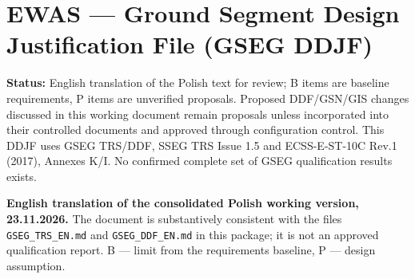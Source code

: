 \section*{EWAS — Ground Segment Design Justification File (GSEG DDJF)}

\textbf{Status:} English translation of the Polish text for review; B items are baseline requirements, P items are unverified proposals. Proposed DDF/\allowbreak{}GSN/\allowbreak{}GIS changes discussed in this working document remain proposals unless incorporated into their controlled documents and approved through configuration control. This DDJF uses GSEG TRS/\allowbreak{}DDF, SSEG TRS Issue 1.5 and ECSS-E-ST-10C Rev.1 (2017), Annexes K/\allowbreak{}I. No confirmed complete set of GSEG qualification results exists.

\par\noindent{\color{TableBorderBlue}\rule{\linewidth}{0.4pt}}\par

\textbf{English translation of the consolidated Polish working version, 23.11.2026.} The document is substantively consistent with the files \texttt{GSEG\_\allowbreak{}TRS\_\allowbreak{}EN.md} and \texttt{GSEG\_\allowbreak{}DDF\_\allowbreak{}EN.md} in this package; it is not an approved qualification report. B — limit from the requirements baseline, P — design assumption.

